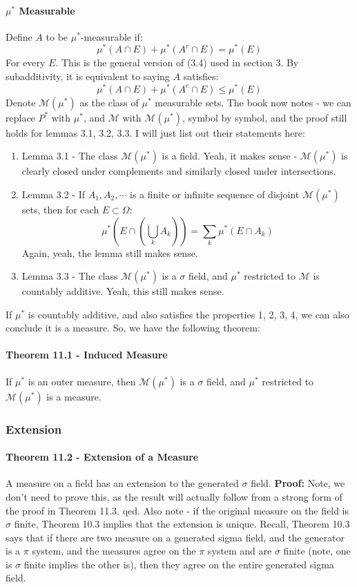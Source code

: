 \documentclass[12pt,a4paper]{article}
\newcommand{\1}[1]{\mathbbm{1}\left\{ #1 \right\}}
\newcommand{\mcal}{\mathcal{M}}
\begin{document}
\paragraph{$\mu^*$ Measurable} Define $A$ to be $\mu^*$-measurable if:
$$
	\mu^*(A \cap E) + \mu^*(A^c \cap E) = \mu^*(E)
$$
For every $E$. This is the general version of (3.4) used in section 3. By subadditivity, it is equivalent to saying $A$ satisfies:
$$
	\mu^*(A \cap E) + \mu^*(A^c \cap E) \leq \mu^*(E)
$$
Denote $\mcal(\mu^*)$ as the class of $\mu^*$ measurable sets. The book now notes - we can replace $P^*$ with $\mu^*$, and $\mcal$ with $\mcal(\mu^*)$, symbol by symbol, and the proof still holds for lemmas 3.1, 3.2, 3.3. I will just list out their statements here:
\begin{enumerate}
	\item Lemma 3.1 - The class $\mcal(\mu^*)$ is a field. Yeah, it makes sense - $\mcal(\mu^*)$ is clearly closed under complements and similarly closed under intersections.
	
	\item Lemma 3.2 - If $A_1, A_2, \cdots$ is a finite or infinite sequence of disjoint $\mcal(\mu^*)$ sets, then for each $E \subset \Omega$:
	$$
		\mu^*\left(E \cap \left(\bigcup_k A_k\right)\right) = \sum_k \mu^*\left(E \cap A_k\right)
	$$
	Again, yeah, the lemma still makes sense.
	
	\item Lemma 3.3 - The class $\mcal(\mu^*)$ is a $\sigma$ field, and $\mu^*$ restricted to $\mcal$ is countably additive. Yeah, this still makes sense.
\end{enumerate}
If $\mu^*$ is countably additive, and also satisfies the properties 1, 2, 3, 4, we can also conclude it is a measure. So, we have the following theorem:

\paragraph{Theorem 11.1 - Induced Measure} If $\mu^*$ is an outer measure, then $\mcal(\mu^*)$ is a $\sigma$ field, and $\mu^*$ restricted to $\mcal(\mu^*)$ is a measure.

\subsubsection{Extension}
\paragraph{Theorem 11.2 - Extension of a Measure} A measure on a field has an extension to the generated $\sigma$ field.
\textbf{Proof:} Note, we don't need to prove this, as the result will actually follow from a strong form of the proof in Theorem 11.3. qed. Also note - if the original measure on the field is $\sigma$ finite, Theorem 10.3 implies that the extension is unique. Recall, Theorem 10.3 says that if there are two measure on a generated sigma field, and the generator is a $\pi$ system, and the measures agree on the $\pi$ system and are $\sigma$ finite (note, one is $\sigma$ finite implies the other is), then they agree on the entire generated sigma field.
\end{document}
